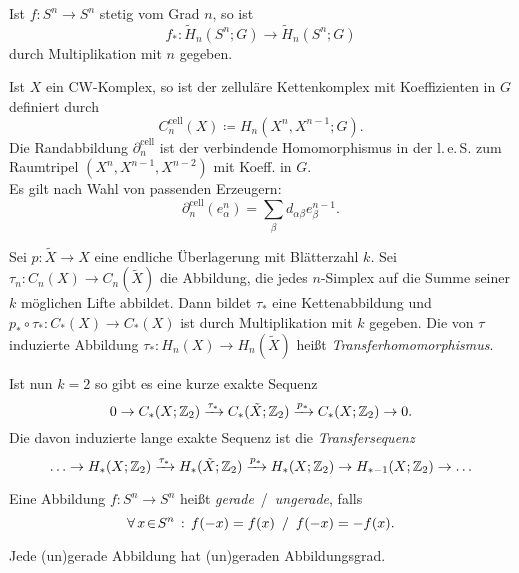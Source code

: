 \documentclass{cheat-sheet}
\newcommand{\RH}{\tilde{H}} %
\newcommand{\cell}{\text{cell}} %
\newcommand{\leS}{l.\,e.\,S.} %
\newcommand{\ZM}[1]{\Z_{#1}} %
\begin{document}
\begin{prop}
  Ist $f : S^n \to S^n$ stetig vom Grad $n$, so ist %
  \[ f_* : \RH_n(S^n; G) \to \RH_n(S^n; G) \]
  durch Multiplikation mit $n$ gegeben.
\end{prop}

\begin{defn}
  Ist $X$ ein CW-Komplex, so ist der zelluläre Kettenkomplex mit Koeffizienten in $G$ definiert durch
  \[ C_n^\cell(X) \coloneqq H_n(X^n, X^{n-1}; G). \]
  Die Randabbildung $\partial^\cell_n$ ist der verbindende Homomorphismus in der \leS{} zum Raumtripel $(X^n, X^{n-1}, X^{n-2})$ mit Koeff. in $G$. \\
  Es gilt nach Wahl von passenden Erzeugern:
  \[ \partial^\cell_n (e_\alpha^n) = \sum_\beta d_{\alpha \beta} e_\beta^{n-1}. \]
\end{defn}

\begin{defn}
  Sei $p : \tilde{X} \to X$ eine endliche Überlagerung mit Blätterzahl $k$. Sei $\tau_n : C_n(X) \to C_n(\tilde{X})$ die Abbildung, die jedes $n$-Simplex auf die Summe seiner $k$ möglichen Lifte abbildet. Dann bildet $\tau_*$ eine Kettenabbildung und $p_* \circ \tau_* : C_*(X) \to C_*(X)$ ist durch Multiplikation mit $k$ gegeben.
  Die von $\tau$ induzierte Abbildung $\tau_* : H_n(X) \to H_n(\tilde{X})$ heißt \emph{Transferhomomorphismus}.
\end{defn}

\begin{defn}
  Ist nun $k=2$ so gibt es eine kurze exakte Sequenz
  \[ 0 \to C_*(X; \ZM{2}) \xrightarrow{\tau_*} C_*(\tilde{X}; \ZM{2}) \xrightarrow{p_*} C_*(X; \ZM{2}) \to 0. \]
  Die davon induzierte lange exakte Sequenz ist die \emph{Transfersequenz}
  \[ \ldots \to H_*(X; \ZM{2}) \xrightarrow{\tau_*} H_*(\tilde{X}; \ZM{2}) \xrightarrow{p_*} H_*(X; \ZM{2}) \to H_{*-1}(X; \ZM{2}) \to \ldots \]
\end{defn}


\begin{defn}
  Eine Abbildung $f : S^n \to S^n$ heißt \emph{gerade} \,/\, \emph{ungerade}, falls
  \[
    \forall \, {x \!\in\! S^n} \,:\,
    f(-x) = f(x)
    \enspace / \enspace
    f(-x) = -f(x).
  \]
\end{defn}

\begin{prop}
  Jede (un)gerade Abbildung hat (un)geraden Abbildungsgrad.
\end{prop}
\end{document}
